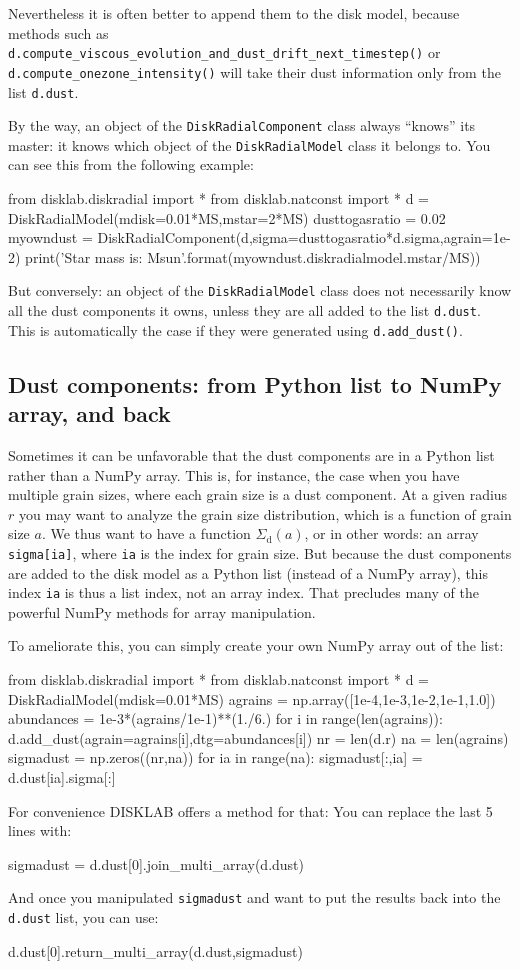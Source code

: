 \documentclass{book}
\newcommand{\code}[1]{{\small\tt #1}}
\begin{document}
Nevertheless it is often better to append them to the disk model, because methods such
as \code{d.compute\_viscous\_evolution\_and\_dust\_drift\_next\_timestep()} or
\code{d.compute\_onezone\_intensity()} will take their dust information only from
the list \code{d.dust}.

By the way, an object of the \code{DiskRadialComponent} class always ``knows'' its
master: it knows which object of the \code{DiskRadialModel} class it belongs to. You
can see this from the following example:
\begin{codebox}
from disklab.diskradial import *
from disklab.natconst import *
d = DiskRadialModel(mdisk=0.01*MS,mstar=2*MS)
dusttogasratio = 0.02
myowndust = DiskRadialComponent(d,sigma=dusttogasratio*d.sigma,agrain=1e-2)
print('Star mass is: {} Msun'.format(myowndust.diskradialmodel.mstar/MS))
\end{codebox}
But conversely: an object of the \code{DiskRadialModel} class does not necessarily
know all the dust components it owns, unless they are all added to the list
\code{d.dust}. This is automatically the case if they were generated using
\code{d.add\_dust()}.

\subsection{Dust components: from Python list to NumPy array, and back}
\label{sec-convert-dust-list-array}
Sometimes it can be unfavorable that the dust components are in a Python list
rather than a NumPy array. This is, for instance, the case when you have
multiple grain sizes, where each grain size is a dust component. At a given
radius $r$ you may want to analyze the grain size distribution, which is a
function of grain size $a$. We thus want to have a function $\Sigma_\mathrm{d}(a)$,
or in other words: an array \code{sigma[ia]}, where \code{ia} is the index for
grain size. But because the dust components are added to the disk model as a
Python list (instead of a NumPy array), this index \code{ia} is thus a
list index, not an array index. That precludes many of the powerful NumPy
methods for array manipulation.

To ameliorate this, you can simply create your own NumPy array out of the
list:
\begin{codebox}
from disklab.diskradial import *
from disklab.natconst import *
d = DiskRadialModel(mdisk=0.01*MS)
agrains      = np.array([1e-4,1e-3,1e-2,1e-1,1.0])
abundances   = 1e-3*(agrains/1e-1)**(1./6.)
for i in range(len(agrains)):
    d.add_dust(agrain=agrains[i],dtg=abundances[i])
nr = len(d.r)
na = len(agrains)
sigmadust = np.zeros((nr,na))
for ia in range(na):
    sigmadust[:,ia] = d.dust[ia].sigma[:]
\end{codebox}
For convenience {\sf DISKLAB} offers a method for that: You can replace the last
5 lines with:
\begin{codebox}
sigmadust = d.dust[0].join_multi_array(d.dust)
\end{codebox}
And once you manipulated \code{sigmadust} and want to put the results back
into the \code{d.dust} list, you can use:
\begin{codebox}
d.dust[0].return_multi_array(d.dust,sigmadust)
\end{codebox}
\end{document}
